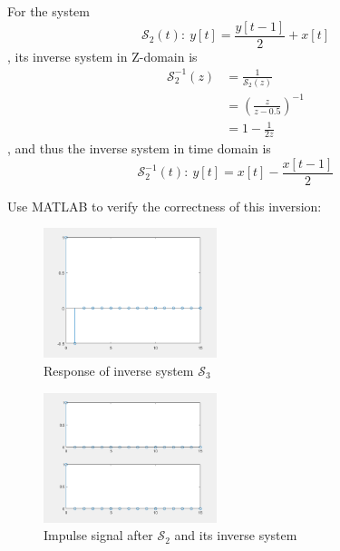 \documentclass[conference]{IEEEtran}
\begin{document}
For the system
\begin{equation}
	\mathcal{S}_{2}(t):\ y[t]=\frac{y[t-1]}{2}+x[t]
\end{equation}
, its inverse system in Z-domain is
\begin{equation}
	\begin{aligned}
		\mathcal{S}_{2}^{-1}(z) & =\frac{1}{\mathcal{S}_{2}(z)}        \\
		                        & =\left( \frac{z}{z-0.5} \right)^{-1} \\
		                        & =1-\frac{1}{2z}
	\end{aligned}
\end{equation}
, and thus the inverse system in time domain is
\begin{equation}
	\mathcal{S}_{2}^{-1}(t):\ y[t]=x[t]-\frac{x[t-1]}{2}
\end{equation}

Use MATLAB to verify the correctness of this inversion:
\begin{figure}[htpb]
	\begin{small}
		\begin{center}
			\includegraphics[width=0.45\textwidth]{../matlab/q26_2.png}
		\end{center}
		\caption{Response of inverse system \(\mathcal{S}_{3}\)}
		\label{fig:resp_s3}
	\end{small}
\end{figure}

\begin{figure}[htpb]
	\begin{small}
		\begin{center}
			\includegraphics[width=0.45\textwidth]{../matlab/q26_3.png}
		\end{center}
		\caption{Impulse signal after \(\mathcal{S}_{2}\) and its inverse system}
		\label{fig:sig_inv_s2}
	\end{small}
\end{figure}
\end{document}
